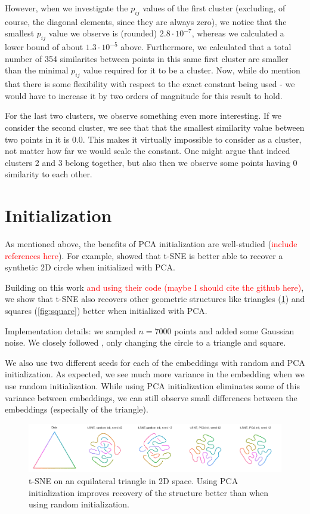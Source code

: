 However, when we investigate the $p_{ij}$ values of the first cluster (excluding, of course, the diagonal elements, since they are always zero), we notice that the smallest $p_{ij}$ value we observe is (rounded) $2.8 \cdot 10^{-7}$, whereas we calculated a lower bound of about $1.3 \cdot 10^{-5}$ above.
Furthermore, we calculated that a total number of 354 similarites between points in this same first cluster are smaller than the minimal $p_{ij}$ value required for it to be a cluster. 
Now, while \cite{LinStei22} do mention that there is some flexibility with respect to the exact constant being used - we would have to increase it by two orders of magnitude for this result to hold. 

For the last two clusters, we observe something even more interesting. 
If we consider the second cluster, we see that that the smallest similarity value between two points in it is $0.0$. 
This makes it virtually impossible to consider as a cluster, not matter how far we would scale the constant. 
One might argue that indeed clusters 2 and 3 belong together, but also then we observe some points having $0$ similarity to each other. 

\section{Initialization}
As mentioned above, the benefits of PCA initialization are well-studied (\textcolor{red}{include references here}). 
For example, \cite{kobak21} showed that t-SNE is better able to recover a synthetic 2D circle when initialized with PCA. 

Building on this work \textcolor{red}{and using their code (maybe I should cite the github here)}, we show that t-SNE also recovers other geometric structures like triangles (\ref{fig:triangle}) and squares (\ref{fig:square}) better when initialized with PCA. 

Implementation details: we sampled $n=7000$ points and added some Gaussian noise. We closely followed \cite{kobak21}, only changing the circle to a triangle and square. 

We also use two different seeds for each of the embeddings with random and PCA initialization. 
As expected, we see much more variance in the embedding when we use random initialization. While using PCA initialization eliminates some of this variance between embeddings, we can still observe small differences between the embeddings (especially of the triangle). 

\begin{figure}[h]
    \centering 
        \includegraphics[width=\linewidth]{figures/t_sne_on_triangle.png}
        \caption{t-SNE on an equilateral triangle in 2D space. Using PCA initialization improves recovery of the structure better than when using random initialization.}
    \label{fig:triangle}
\end{figure}

